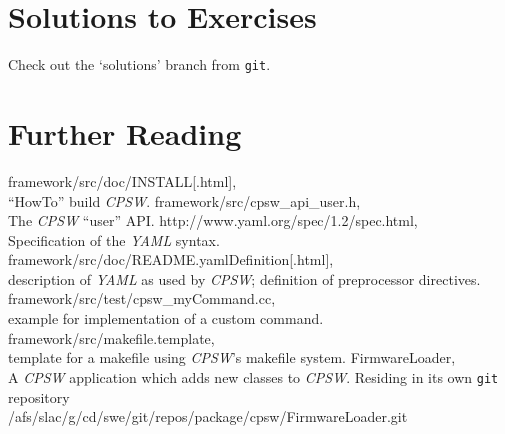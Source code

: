 \documentclass[10pt]{article}
\newcommand{\ita}[1]{\emph{#1}}
\newcommand{\cpsw}      {\ita {CPSW}}
\newcommand{\yaml}      {\ita {YAML}}
\newcommand{\git}       {{\tt{}git}}
\newcommand{\cod}[1] {{\tt#1}}
\begin{document}
\section{Solutions to Exercises}
Check out the `solutions' branch from \git{}.

\section{Further Reading}

\begin{thebibliography}{9}
framework/src/doc/INSTALL[.html],\\
``HowTo'' build \cpsw{}.
framework/src/cpsw\_api\_user.h,\\
The \cpsw{} ``user'' API.
http://www.yaml.org/spec/1.2/spec.html,\\
Specification of the \yaml{} syntax.
framework/src/doc/README.yamlDefinition[.html],\\
description of \yaml{} as used by \cpsw{}; definition of preprocessor directives.
framework/src/test/cpsw\_myCommand.cc,\\
example for implementation of a custom command.
framework/src/makefile.template,\\
template for a makefile using \cpsw{}'s makefile system.
FirmwareLoader,\\
A \cpsw{} application which adds new classes to \cpsw{}. Residing in its own
\cod{git} repository\\
/afs/slac/g/cd/swe/git/repos/package/cpsw/FirmwareLoader.git
\end{thebibliography}
\end{document}
